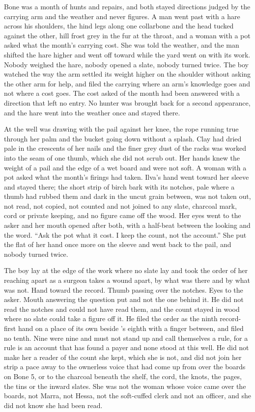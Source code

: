 Bone was a month of hunts and repairs, and both stayed directions judged by the carrying arm and the weather and never figures. A man went past with a hare across his shoulders, the hind legs along one collarbone and the head tucked against the other, hill frost grey in the fur at the throat, and a woman with a pot asked what the month's carrying cost. She was told the weather, and the man shifted the hare higher and went off toward  while the yard went on with its work. Nobody weighed the hare, nobody opened a slate, nobody turned twice. The boy watched the way the arm settled its weight higher on the shoulder without asking the other arm for help, and filed the carrying where an arm's knowledge goes and not where a cost goes. The cost asked of the month had been answered with a direction that left no entry. No hunter was brought back for a second appearance, and the hare went into the weather once and stayed there.

At the well  was drawing with the pail against her knee, the rope running true through her palm and the bucket going down without a splash. Clay had dried pale in the crescents of her nails and the finer grey dust of the racks was worked into the seam of one thumb, which she did not scrub out. Her hands knew the weight of a pail and the edge of a wet board and were not soft. A woman with a pot asked what the month's firings had taken. Ilva's hand went toward her sleeve and stayed there; the short strip of birch bark with its notches, pale where a thumb had rubbed them and dark in the uncut grain between, was not taken out, not read, not copied, not counted and not joined to any slate, charcoal mark, cord or private keeping, and no figure came off the wood. Her eyes went to the asker and her mouth opened after both, with a half-beat between the looking and the word. “Ask the pot what it cost. I keep the count, not the account.” She put the flat of her hand once more on the sleeve and went back to the pail, and nobody turned twice.

The boy lay at the edge of the work where no slate lay and took the order of her reaching apart as a surgeon takes a wound apart, by what was there and by what was not. Hand toward the record. Thumb passing over the notches. Eyes to the asker. Mouth answering the question put and not the one behind it. He did not read the notches and could not have read them, and the count stayed in wood where no slate could take a figure off it. He filed the order as the ninth record-first hand on a place of its own beside 's eighth with a finger between, and filed no tenth. Nine were nine and must not stand up and call themselves a rule, for a rule is an account that has found a payer and none stood at this well. He did not make her a reader of the count she kept, which she is not, and did not join her strip a pace away to the ownerless voice that had come up from  over the boards on Bone 5, or to the charcoal beneath the shelf, the cord, the knots, the pages, the tins or the inward slates. She was not the woman whose voice came over the boards, not Marra, not Hessa, not the soft-cuffed clerk and not an officer, and she did not know she had been read.

